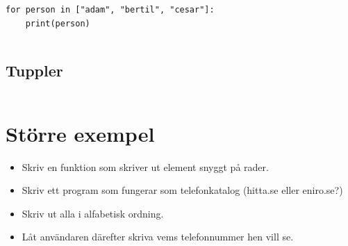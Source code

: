 \begin{frame}[fragile]
  \begin{example}
    \begin{verbatim}
for person in ["adam", "bertil", "cesar"]:
    print(person)
    \end{verbatim}
  \end{example}
\end{frame}

\begin{frame}[fragile]
  \begin{example}
    \inputminted{python}{examples/phone-for.py}
  \end{example}
\end{frame}



\subsection{Tuppler}

\begin{frame}[fragile]
  \begin{example}[tuples.py]
    \inputminted{python}{examples/tuples.py}
  \end{example}
\end{frame}


\section{Större exempel}

\begin{frame}
  \begin{exercise}
    \begin{itemize}
      \item Skriv en funktion som skriver ut element snyggt på rader.
    \end{itemize}
  \end{exercise}
\end{frame}

\begin{frame}
  \begin{exercise}
    \begin{itemize}
      \item Skriv ett program som fungerar som telefonkatalog (hitta.se eller 
        eniro.se?)
      \item Skriv ut alla i alfabetisk ordning.
      \item Låt användaren därefter skriva vems telefonnummer hen vill se.
    \end{itemize}
  \end{exercise}
\end{frame}

